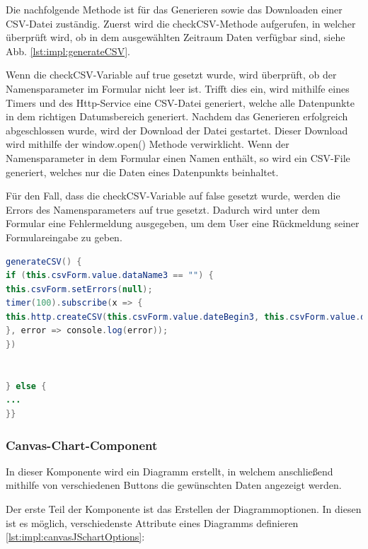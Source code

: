 Die nachfolgende Methode ist für das Generieren sowie das Downloaden einer CSV-Datei zuständig. Zuerst wird die checkCSV-Methode aufgerufen, in welcher überprüft wird, ob in dem ausgewählten Zeitraum Daten verfügbar sind, siehe Abb. \ref{lst:impl:generateCSV}.


Wenn die checkCSV-Variable auf true gesetzt wurde, wird überprüft, ob der Namensparameter im Formular nicht leer ist. Trifft dies ein, wird mithilfe eines Timers und des Http-Service eine CSV-Datei generiert, welche alle Datenpunkte in dem richtigen Datumsbereich generiert. Nachdem das Generieren erfolgreich abgeschlossen wurde, wird der Download der Datei gestartet. Dieser Download wird mithilfe der window.open() Methode verwirklicht. Wenn der Namensparameter in dem Formular einen Namen enthält, so wird ein CSV-File generiert, welches nur die Daten eines Datenpunkts beinhaltet.


Für den Fall, dass die checkCSV-Variable auf false gesetzt wurde, werden die Errors des Namensparameters auf true gesetzt. Dadurch wird unter dem Formular eine Fehlermeldung ausgegeben, um dem User eine Rückmeldung seiner Formulareingabe zu geben.


\begin{lstlisting}[language=java,caption=CSV-File generieren,label=lst:impl:generateCSV]
generateCSV() {
if (this.csvForm.value.dataName3 == "") {
this.csvForm.setErrors(null);
timer(100).subscribe(x => {
this.http.createCSV(this.csvForm.value.dateBegin3, this.csvForm.value.dateEnd3, this.csvForm.value.timeBegin3, this.csvForm.value.timeEnd3, "C:/angular1/monitor.csv").subscribe(value => { window.open("http://localhost:8081/logEntry/download/");
}, error => console.log(error));
})


} else {
...
}}
\end{lstlisting}



\subsubsection{Canvas-Chart-Component}


In dieser Komponente wird ein Diagramm erstellt, in welchem anschließend mithilfe von verschiedenen Buttons die gewünschten Daten angezeigt werden.


Der erste Teil der Komponente ist das Erstellen der Diagrammoptionen. In diesen ist es möglich, verschiedenste Attribute eines Diagramms definieren \ref{lst:impl:canvasJSchartOptions}:


